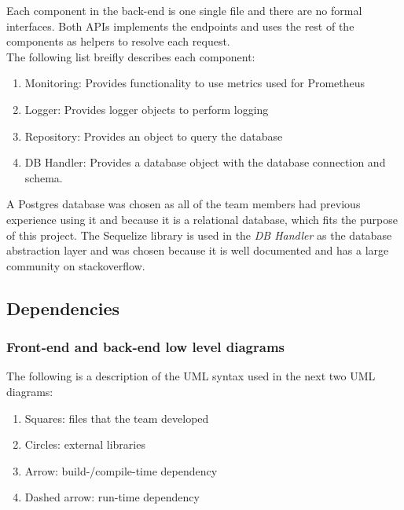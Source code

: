 Each component in the back-end is one single file and there are no formal interfaces. Both APIs implements the endpoints and uses the rest of the components as helpers to resolve each request.\\
The following list breifly describes each component:
\begin{enumerate}
    \item Monitoring: Provides functionality to use metrics used for Prometheus
    \item Logger: Provides logger objects to perform logging
    \item Repository: Provides an object to query the database
    \item DB Handler: Provides a database object with the database connection and schema.
\end{enumerate}

A Postgres database was chosen as all of the team members had previous experience using it and because it is a relational database, which fits the purpose of this project. The Sequelize library is used in the \textit{DB Handler} as the database abstraction layer and was chosen because it is well documented \cite{sequelize} and has a large community on stackoverflow.

\newpage
\subsection{Dependencies}

\subsubsection{Front-end and back-end low level diagrams}
The following is a description of the UML syntax used in the next two UML diagrams:
\begin{enumerate}
    \item Squares: files that the team developed
    \item Circles: external libraries
    \item Arrow: build-/compile-time dependency
    \item Dashed arrow: run-time dependency
\end{enumerate}

